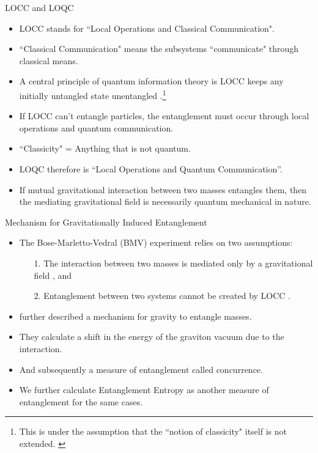 \documentclass[12pt,aspectratio=1610]{beamer}
\begin{document}
\begin{frame}{LOCC and LOQC}
    \begin{itemize}
        \item <1> LOCC stands for ``Local Operations and Classical Communication".
        \item <2> ``Classical Communication" means the subsystems ``communicate" through classical means.
        \item <3> A central principle of quantum information theory is LOCC keeps any initially untangled state unentangled \citep{Bose_2017}.\footnote{This is under the assumption that the ``notion of classicity" itself is not extended. \citep{PhysRevA.72.062109, Hall_2018}}
        \item <4> If LOCC can’t entangle particles, the entanglement must occur through local operations and quantum communication.
        \item <5> ``Classicity" = Anything that is not quantum.
        \item <6> LOQC therefore is ``Local Operations and Quantum Communication''.
        \item <7> If mutual gravitational interaction between two masses entangles them, then the mediating gravitational field is necessarily quantum mechanical in nature.
    \end{itemize}
\end{frame}

\begin{frame}{Mechanism for Gravitationally Induced Entanglement}
    \begin{itemize}
        \item The Bose-Marletto-Vedral (BMV) experiment \citep{Christodoulou_2020} relies on two assumptions:
        \begin{enumerate}
            \item[1.] The interaction between two masses is mediated only by a gravitational field \citep{Bose_2017}, and
            \item[2.] Entanglement between two systems cannot be created by LOCC \citep{Bose_2017, Marletto_2017}.
        \end{enumerate}
        \item \citet{Bose_2022} further described a mechanism for gravity to entangle masses.
        \item They calculate a shift in the energy of the graviton vacuum due to the interaction.
        \item And subsequently a measure of entanglement called concurrence. \citep{PhysRevLett.78.5022, PhysRevA.64.042315}
        \item We further calculate Entanglement Entropy as another measure of entanglement for the same cases.
    \end{itemize}
\end{frame}
\end{document}
